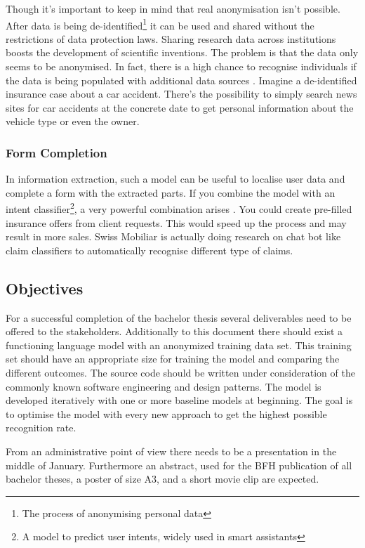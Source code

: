 Though it's important to keep in mind that real anonymisation isn't possible. After data is being de-identified\footnote{The process
of anonymising personal data} it can be used and shared without the restrictions of data protection laws. Sharing research data
across institutions boosts the development of scientific inventions. The problem is that the data only seems to be anonymised. In
fact, there is a high chance to recognise individuals if the data is being populated with additional data sources \cite{rocher19}.
Imagine a de-identified insurance case about a car accident. There's the possibility to simply search news sites for car accidents at
the concrete date to get personal information about the vehicle type or even the owner.

\subsubsection{Form Completion}

In information extraction, such a model can be useful to localise user data and complete a form with the extracted parts. If
you combine the model with an intent classifier\footnote{A model to predict user intents, widely used in smart assistants},
a very powerful combination arises \cite{jain18}. You could create pre-filled insurance offers from client requests. This would
speed up the process and may result in more sales. Swiss Mobiliar is actually doing research on chat bot like claim classifiers to
automatically recognise different type of claims.

\subsection{Objectives}

For a successful completion of the bachelor thesis several deliverables need to be offered to the stakeholders. Additionally
to this document there should exist a functioning language model with an anonymized training data set. This training set
should have an appropriate size for training the model and comparing the different outcomes. The source code should be
written under consideration of the commonly known software engineering and design patterns. The model is developed
iteratively with one or more baseline models at beginning. The goal is to optimise the model with every new approach to
get the highest possible recognition rate.

From an administrative point of view there needs to be a presentation in the middle of January. Furthermore an abstract, used
for the BFH publication of all bachelor theses, a poster of size A3, and a short movie clip are expected.

